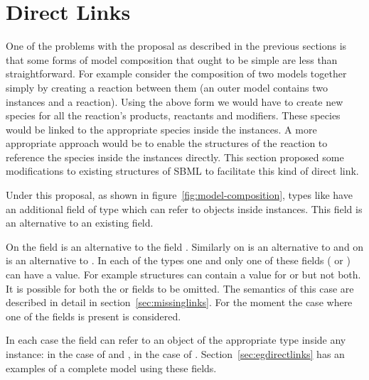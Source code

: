 \documentclass{cekarticle}
\begin{document}

\section{Direct Links}
\label{sec:directlinks}

One of the problems with the proposal as described in the previous sections
is that some forms of model composition that ought to be simple are less than
straightforward.  For example consider the composition of two models together
simply by creating a reaction between them (an outer model contains two instances
and a reaction).  Using the above form we would have to create new species
for all the reaction's products, reactants and modifiers.  These species would be linked
to the appropriate species inside the instances.  A more appropriate approach
would be to enable the  structures of the reaction
to reference the species inside the instances directly.
This section proposed some modifications to existing structures of SBML
to facilitate this kind of direct link.

Under this proposal, as shown in figure~\ref{fig:model-composition}, types like
 have an additional field of type 
 which can refer to objects inside instances.  This field is an
alternative to an existing  field.

On  the  field 
is an alternative to the  field .  Similarly on   is an
alternative to  and on   is
an alternative to .
In each of the types one and only one of
these fields ( or ) can have a value.
For example  structures can contain
a value for  or  but not both.
It is possible for both the  or  fields to be
omitted.  The semantics of this case are described in detail in section~\ref{sec:missinglinks}.
For the moment the case where one of the fields is present is considered.

In each case the  field
can refer to an object of the appropriate type inside any instance: 
in the case of  and ,  in the case
of . Section~\ref{sec:egdirectlinks} has an examples of a complete model using these fields.
\end{document}
